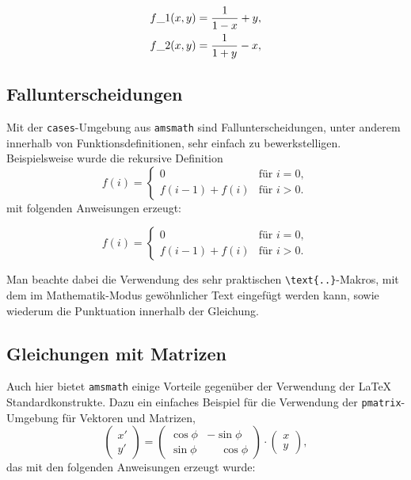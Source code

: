 \begin{align}
  f\_1 (x,y) &= \frac{1}{1-x} + y , \label{eq:f11} \\
  \formelentry{Formel 1}
  f\_2 (x,y) &= \frac{1}{1+y} - x , \label{eq:f21}
  \formelentry{Formel 2}
\end{align}



\subsection{Fallunterscheidungen}

Mit der \texttt{cases}-Umgebung aus \texttt{amsmath} sind Fallunterscheidungen, unter anderem innerhalb von Funktionsdefinitionen, sehr einfach zu bewerkstelligen. Beispielsweise wurde die rekursive Definition
%
\begin{equation}
	f(i) =
	\begin{cases}
	  0             & \text{für $i = 0$},\\
	  f(i-1) + f(i) & \text{für $i > 0$}.
	\end{cases}
\end{equation}
mit folgenden Anweisungen erzeugt:
%

\begin{equation}
	f(i) =
	\begin{cases}
	  0             & \text{für $i = 0$},\\
	  f(i-1) + f(i) & \text{für $i > 0$}.
	\end{cases}
\end{equation}

%
Man beachte dabei die Verwendung des sehr praktischen \verb!\text{..}!-Makros, mit dem im Mathematik-Modus gewöhnlicher Text eingefügt werden kann, sowie wiederum die Punktuation innerhalb der Gleichung.

\subsection{Gleichungen mit Matrizen}

Auch hier bietet \texttt{amsmath} einige Vorteile gegenüber der Verwendung der \LaTeX{} Standardkonstrukte. Dazu ein einfaches Beispiel für die Verwendung der \texttt{pmatrix}-Umgebung für Vektoren und Matrizen,
%
\begin{equation}
	\begin{pmatrix} x' \\ y' \end{pmatrix}
	= 
	\begin{pmatrix}
	  \cos \phi & -\sin \phi \\
	  \sin \phi & \phantom{-}\cos \phi
	\end{pmatrix} 
	\cdot
	\begin{pmatrix}	x \\ y \end{pmatrix} ,
\end{equation}
%
das mit den folgenden Anweisungen erzeugt wurde:
%

